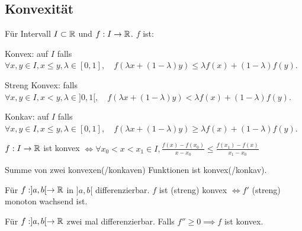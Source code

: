\subsection{Konvexität}
Für Intervall $I \subset \mathbb{R}$ und $f:I \to \mathbb{R}$. $f$ ist:
\begin{compactdesc}
    \item[Konvex:] auf $I$ falls $\forall x, y \in I, x \le y, \lambda \in [0, 1], \quad f(\lambda x + (1- \lambda)y) \le \lambda f(x) + (1 - \lambda) f(y)$.
    \item[Streng Konvex:] falls $\forall x, y \in I, x < y, \lambda \in ]0, 1[, \quad f(\lambda x + (1 - \lambda)y) < \lambda f(x) + (1 - \lambda)f(y)$.
    \item[Konkav:] auf $I$ falls $\forall x, y \in I, x \le y, \lambda \in [0, 1], \quad f(\lambda x + (1- \lambda)y) \ge \lambda f(x) + (1 - \lambda) f(y)$.
\end{compactdesc}
\begin{compactitem}
\item $f:I \to \mathbb{R}$ ist konvex $\iff \forall x_0 < x < x_1 \in I, \frac{f(x) - f(x_0)}{x-x_0} \le \frac{f(x_1) - f(x)}{x_1 - x_0}$
    \item Summe von zwei konvexen(/konkaven) Funktionen ist konvex(/konkav).
    \item Für $f:]a,b[ \to \mathbb{R}$ in $]a,b[$ differenzierbar. $f$ ist (streng) konvex $\iff f'$ (streng) monoton wachsend ist.
    \item Für $f:]a,b[ \to \mathbb{R}$ zwei mal differenzierbar. Falls $f'' \ge 0 \implies f$ ist konvex.
\end{compactitem}


